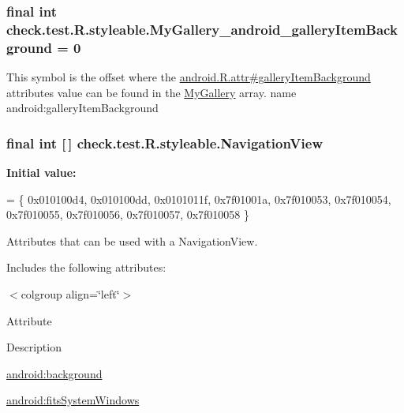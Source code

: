 \subsubsection[{My\+Gallery\+\_\+android\+\_\+gallery\+Item\+Background}]{\setlength{\rightskip}{0pt plus 5cm}final int check.\+test.\+R.\+styleable.\+My\+Gallery\+\_\+android\+\_\+gallery\+Item\+Background = 0\hspace{0.3cm}{\ttfamily [static]}}\label{classcheck_1_1test_1_1_r_1_1styleable_a289156879224bdba08596f12f78a9a86}
This symbol is the offset where the \hyperlink{}{android.\+R.\+attr\#gallery\+Item\+Background} attribute\textquotesingle{}s value can be found in the \hyperlink{classcheck_1_1test_1_1_r_1_1styleable_a9c0880eccc65c48e229a8b4611d2b30f}{My\+Gallery} array.  name android\+:gallery\+Item\+Background \hypertarget{classcheck_1_1test_1_1_r_1_1styleable_a70ac59d722f1e4aac4b206dcf5f53107}{}
\subsubsection[{Navigation\+View}]{\setlength{\rightskip}{0pt plus 5cm}final int \mbox{[}$\,$\mbox{]} check.\+test.\+R.\+styleable.\+Navigation\+View\hspace{0.3cm}{\ttfamily [static]}}\label{classcheck_1_1test_1_1_r_1_1styleable_a70ac59d722f1e4aac4b206dcf5f53107}
{\bfseries Initial value\+:}
\begin{DoxyCode}
= \{
            0x010100d4, 0x010100dd, 0x0101011f, 0x7f01001a,
            0x7f010053, 0x7f010054, 0x7f010055, 0x7f010056,
            0x7f010057, 0x7f010058
        \}
\end{DoxyCode}
Attributes that can be used with a Navigation\+View. 

Includes the following attributes\+:

\begin{TabularC}{0}
\hline
\end{TabularC}
$<$colgroup align=\char`\"{}left\char`\"{}$>$ 

Attribute

Description 

{\ttfamily \hyperlink{classcheck_1_1test_1_1_r_1_1styleable_ad8bc81f909c3c15ed73a95d19448d19a}{android\+:background}}

{\ttfamily \hyperlink{classcheck_1_1test_1_1_r_1_1styleable_a69ae6facbf34d06b9f470f7471dfff79}{android\+:fits\+System\+Windows}}

